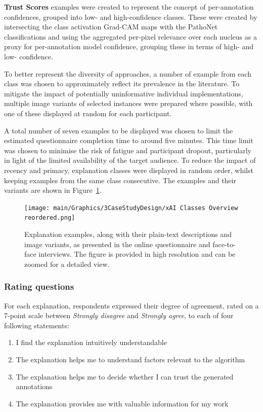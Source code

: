 \textbf{Trust Scores} examples were created to represent the concept of per-annotation confidences, grouped into low- and high-confidence classes. These were created by intersecting the class activation Grad-CAM maps with the PathoNet classifications and using the aggregated per-pixel relevance over each nucleus as a proxy for per-annotation model confidence, grouping these in terms of high- and low- confidence.

To better represent the diversity of approaches, a number of example from each class was chosen to approximately reflect its prevalence in the literature. To mitigate the impact of potentially uninformative individual implementations, multiple image variants of selected instances were prepared where possible, with one of these displayed at random for each participant. 

A total number of seven examples to be displayed was chosen to limit the estimated questionnaire completion time to around five minutes. This time limit was chosen to minimise the risk of fatigue and participant dropout, particularly in light of the limited availability of the target audience. To reduce the impact of recency and primacy, explanation classes were displayed in random order, whilst keeping examples from the same class consecutive. The examples and their variants are shown in Figure~\ref{fig:classes_overview}.

\begin{figure}
\centering
\begin{minipage}[c]{0.85\textwidth}
    \texttt{[image: main/Graphics/3CaseStudyDesign/xAI Classes Overview reordered.png]}
    \caption{Explanation examples, along with their plain-text descriptions and image variants, as presented in the online questionnaire and face-to-face interviews. The figure is provided in high resolution and can be zoomed for a detailed view.}
    \label{fig:classes_overview}
\end{minipage}
\end{figure}

\subsubsection{Rating questions}
 For each explanation, respondents expressed their degree of agreement, rated on a 7-point scale between \textit{Strongly disagree} and \textit{Strongly agree}, to each of four following statements:

 \begin{enumerate}
    \item I find the explanation intuitively understandable
    \item The explanation helps me to understand factors relevant to the algorithm
    \item The explanation helps me to decide whether I can trust the generated annotations
    \item The explanation provides me with valuable information for my work
\end{enumerate}


